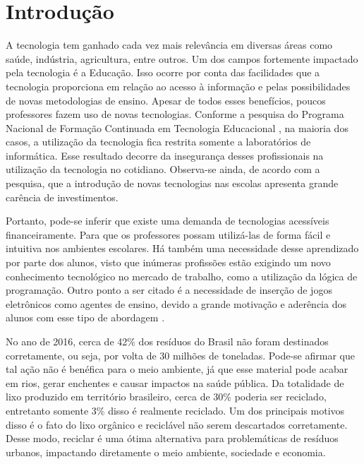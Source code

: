 
\chapter{Introdução}\label{intro}

A tecnologia tem ganhado cada vez mais relevância em diversas áreas como saúde, indústria, agricultura, entre outros. Um dos campos fortemente impactado pela tecnologia é a Educação. Isso ocorre por conta das facilidades que a tecnologia proporciona em relação ao acesso à informação e pelas possibilidades de novas metodologias de ensino. Apesar de todos esses benefícios, poucos professores fazem uso de novas tecnologias. Conforme a pesquisa do Programa Nacional de Formação Continuada em Tecnologia Educacional \cite{} , na maioria dos casos, a utilização da tecnologia fica restrita somente a laboratórios de informática. Esse resultado decorre da insegurança desses profissionais na utilização da tecnologia no cotidiano. Observa-se ainda, de acordo com a pesquisa, que a introdução de novas tecnologias nas escolas apresenta grande carência de investimentos.

Portanto, pode-se inferir que existe uma demanda de tecnologias acessíveis financeiramente. Para que os professores possam utilizá-las de forma fácil e intuitiva nos ambientes escolares. Há também uma necessidade desse aprendizado por parte dos alunos, visto que inúmeras profissões estão exigindo um novo conhecimento tecnológico no mercado de trabalho, como a utilização da lógica de programação. Outro ponto a ser citado é a necessidade de inserção de jogos eletrônicos como agentes de ensino, devido a grande motivação e aderência dos alunos com esse tipo de abordagem \cite{}.

No ano de 2016, cerca de 42\% dos resíduos do Brasil não foram destinados corretamente, ou seja, por volta de 30 milhões de toneladas. Pode-se afirmar que tal ação não é benéfica para o meio ambiente, já que esse material pode acabar em rios, gerar enchentes e causar impactos na saúde pública. Da totalidade de lixo produzido em território brasileiro, cerca de 30\% poderia ser reciclado, entretanto somente 3\% disso é realmente reciclado. Um dos principais motivos disso é o fato do lixo orgânico e reciclável não serem descartados corretamente. Desse modo, reciclar é uma ótima alternativa para problemáticas de resíduos urbanos, impactando diretamente o meio ambiente, sociedade e economia. 

